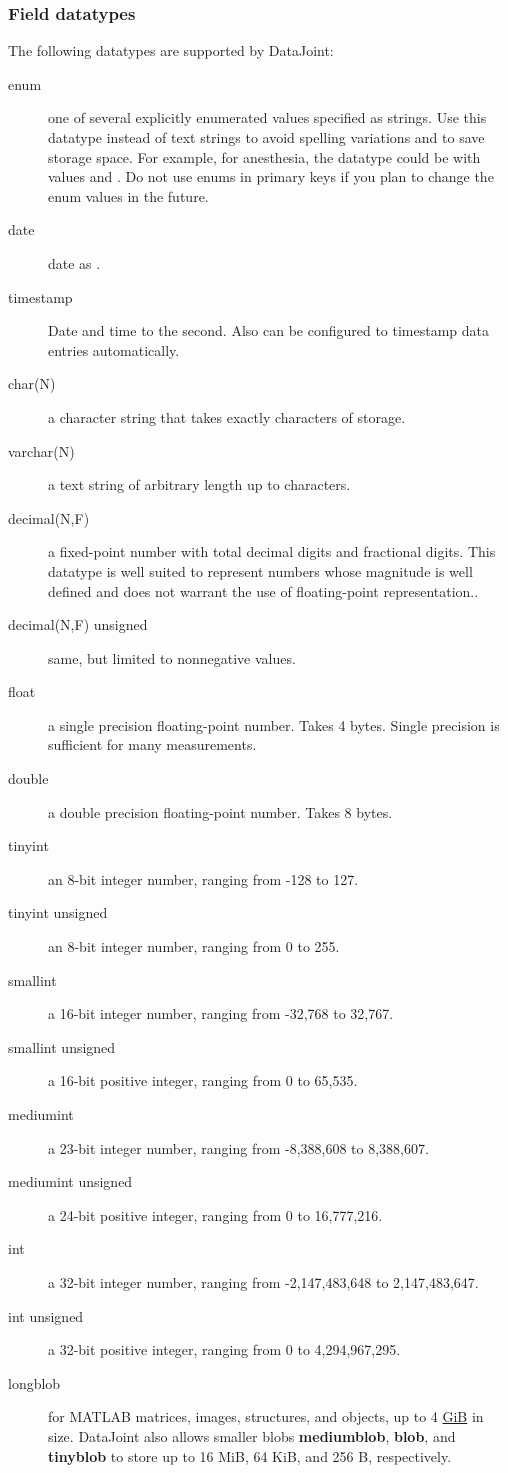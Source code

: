 \documentclass[10pt]{article}
\begin{document}
\subsubsection{Field datatypes}\label{sec:datatypes}
The following datatypes are supported by DataJoint:
\begin{description}
\item[enum] one of several explicitly enumerated values specified as strings. Use this datatype instead of text strings to avoid spelling variations and to save storage space.  For example, for anesthesia, the datatype could be  with values  and .  Do not use enums in primary keys if you plan to change the enum values in the future.
\item[date] date as .
\item[timestamp]  Date and time to the second.  Also can be configured to timestamp data entries automatically.
\item[char(N)]  a character string that takes exactly  characters of storage.
\item[varchar(N)]  a text string of arbitrary length up to  characters. 
\item[decimal(N,F)]  a fixed-point number with  total decimal digits and  fractional digits. This datatype is well suited to represent numbers whose magnitude is well defined and does not warrant the use of floating-point representation..  
\item[decimal(N,F) unsigned] same, but limited to nonnegative values. 
\item[float]  a single precision floating-point number.  Takes 4 bytes.  Single precision is sufficient for many measurements.
\item[double]  a double precision floating-point number. Takes 8 bytes.  
\item[tinyint] an 8-bit integer number, ranging from -128 to 127.  
\item[tinyint unsigned] an 8-bit integer number, ranging from 0 to 255.
\item[smallint] a 16-bit integer number, ranging from -32,768 to 32,767.
\item[smallint unsigned] a 16-bit positive integer, ranging from 0 to 65,535.
\item[mediumint] a 23-bit integer number, ranging from -8,388,608 to 8,388,607.  
\item[mediumint unsigned] a 24-bit positive integer, ranging from 0 to 16,777,216.
\item[int] a 32-bit integer number, ranging from -2,147,483,648 to 2,147,483,647.  
\item[int unsigned] a 32-bit positive integer, ranging from 0 to 4,294,967,295.
\item[longblob] for MATLAB matrices, images, structures, and objects, up to 4 \href{http://en.wikipedia.org/wiki/Gibibyte}{GiB} in size.  DataJoint also allows smaller blobs 
{\bf mediumblob}, {\bf blob}, and {\bf tinyblob} to store up to 16 MiB, 64 KiB, and 256 B, respectively. 
\end{description}
\end{document}
